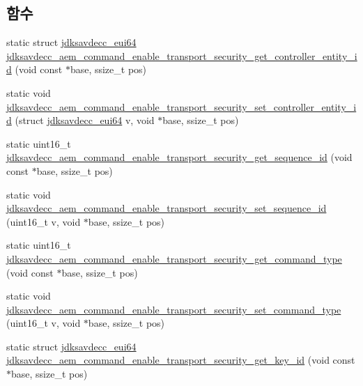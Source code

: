 \subsection*{함수}
\begin{DoxyCompactItemize}
\item 
static struct \hyperlink{structjdksavdecc__eui64}{jdksavdecc\+\_\+eui64} \hyperlink{group__command__enable__transport__security_ga0642c73dd99b06305e370d1228604374}{jdksavdecc\+\_\+aem\+\_\+command\+\_\+enable\+\_\+transport\+\_\+security\+\_\+get\+\_\+controller\+\_\+entity\+\_\+id} (void const $\ast$base, ssize\+\_\+t pos)
\item 
static void \hyperlink{group__command__enable__transport__security_gac5b016a1108095cdc73d2517cab92512}{jdksavdecc\+\_\+aem\+\_\+command\+\_\+enable\+\_\+transport\+\_\+security\+\_\+set\+\_\+controller\+\_\+entity\+\_\+id} (struct \hyperlink{structjdksavdecc__eui64}{jdksavdecc\+\_\+eui64} v, void $\ast$base, ssize\+\_\+t pos)
\item 
static uint16\+\_\+t \hyperlink{group__command__enable__transport__security_ga3fc1a21186afdbc5fde6a2777f72c50d}{jdksavdecc\+\_\+aem\+\_\+command\+\_\+enable\+\_\+transport\+\_\+security\+\_\+get\+\_\+sequence\+\_\+id} (void const $\ast$base, ssize\+\_\+t pos)
\item 
static void \hyperlink{group__command__enable__transport__security_gac89ec6944da321a46a35bb7e150038f3}{jdksavdecc\+\_\+aem\+\_\+command\+\_\+enable\+\_\+transport\+\_\+security\+\_\+set\+\_\+sequence\+\_\+id} (uint16\+\_\+t v, void $\ast$base, ssize\+\_\+t pos)
\item 
static uint16\+\_\+t \hyperlink{group__command__enable__transport__security_ga049e9411d06afeaf7e03cd90b3ddc310}{jdksavdecc\+\_\+aem\+\_\+command\+\_\+enable\+\_\+transport\+\_\+security\+\_\+get\+\_\+command\+\_\+type} (void const $\ast$base, ssize\+\_\+t pos)
\item 
static void \hyperlink{group__command__enable__transport__security_gaaeb2e2d92f20e4ca4a629317b89784cb}{jdksavdecc\+\_\+aem\+\_\+command\+\_\+enable\+\_\+transport\+\_\+security\+\_\+set\+\_\+command\+\_\+type} (uint16\+\_\+t v, void $\ast$base, ssize\+\_\+t pos)
\item 
static struct \hyperlink{structjdksavdecc__eui64}{jdksavdecc\+\_\+eui64} \hyperlink{group__command__enable__transport__security_ga48bee7ff6b7fd266f00de65740658e2a}{jdksavdecc\+\_\+aem\+\_\+command\+\_\+enable\+\_\+transport\+\_\+security\+\_\+get\+\_\+key\+\_\+id} (void const $\ast$base, ssize\+\_\+t pos)
\item 

\end{DoxyCompactItemize}
